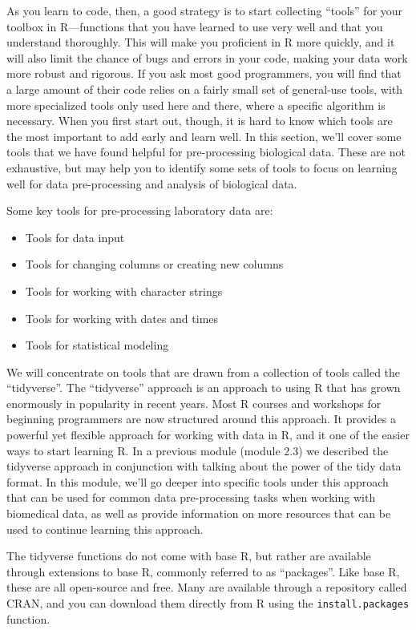 \documentclass[]{tufte-book}
\providecommand{\tightlist}{%
  \setlength{\itemsep}{0pt}\setlength{\parskip}{0pt}}
\begin{document}
As you learn to code, then, a good strategy is to start collecting ``tools'' for
your toolbox in R---functions that you have learned to use very well and that
you understand thoroughly. This will make you proficient in R more quickly, and
it will also limit the chance of bugs and errors in your code, making your data
work more robust and rigorous. If you ask most good programmers, you will find
that a large amount of their code relies on a fairly small set of general-use
tools, with more specialized tools only used here and there, where a specific
algorithm is necessary. When you first start out, though, it is hard to know
which tools are the most important to add early and learn well. In this section,
we'll cover some tools that we have found helpful for pre-processing biological
data. These are not exhaustive, but may help you to identify some sets of tools
to focus on learning well for data pre-processing and analysis of biological
data.

Some key tools for pre-processing laboratory data are:

\begin{itemize}
\tightlist
\item
  Tools for data input
\item
  Tools for changing columns or creating new columns
\item
  Tools for working with character strings
\item
  Tools for working with dates and times
\item
  Tools for statistical modeling
\end{itemize}

We will concentrate on tools that are drawn from a collection of tools called the
``tidyverse''. The ``tidyverse'' approach is an approach to using R that has grown
enormously in popularity in recent years. Most R courses and workshops for
beginning programmers are now structured around this approach. It provides a
powerful yet flexible approach for working with data in R, and it one of the
easier ways to start learning R. In a previous module (module 2.3) we described
the tidyverse approach in conjunction with talking about the power of the tidy
data format. In this module, we'll go deeper into specific tools under this
approach that can be used for common data pre-processing tasks when working with
biomedical data, as well as provide information on more resources that can be
used to continue learning this approach.

The tidyverse functions do not come with base R, but rather are available
through extensions to base R, commonly referred to as ``packages''. Like base
R, these are all open-source and free. Many are available through a
repository called CRAN, and you can download them directly from R using the
\texttt{install.packages} function.
\end{document}
